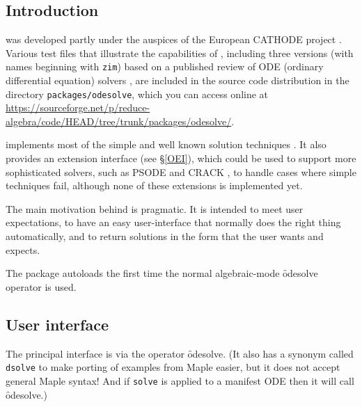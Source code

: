 


\newcommand{\odesolve}{\f{odesolve}}


\subsection{Introduction}

 \cite{MacCallum:88,Wright:97,Wright:99}
was developed partly under the auspices of the European CATHODE
project \cite{CATHODE}.  Various test files that illustrate the
capabilities of , including three versions (with names
beginning with \texttt{zim}) based on a published review of ODE
(ordinary differential equation) solvers \cite{PostelZimmermann:96},
are included in the source code distribution in the directory
\texttt{packages/odesolve}, which you can access online at\\
\url{https://sourceforge.net/p/reduce-algebra/code/HEAD/tree/trunk/packages/odesolve/}.

 implements most of the simple and well known solution
techniques \cite{Zwillinger:92}.  It also provides an extension
interface (see \S\ref{OEI}), which could be used to support more
sophisticated solvers, such as PSODE
\cite{Man:94a,Man:97,PrelleSinger:83} and CRACK \cite{Brand:92}, to
handle cases where simple techniques fail, although none of these
extensions is implemented yet.

The main motivation behind  is pragmatic.  It is intended to
meet user expectations, to have an easy user-interface that normally
does the right thing automatically, and to return solutions in the
form that the user wants and expects.

The  package autoloads the first time the normal
algebraic-mode \odesolve{} operator is used.


\subsection{User interface}
\hypertarget{operator:ODESOLVE}{}
\hypertarget{operator:DSOLVE}{}

The principal interface is via the operator \odesolve.  (It also has a
synonym called \texttt{dsolve} to make porting of examples from Maple
easier, but it does not accept general Maple syntax!  And if
\texttt{solve} is applied to a manifest ODE then it will call
\odesolve.)

